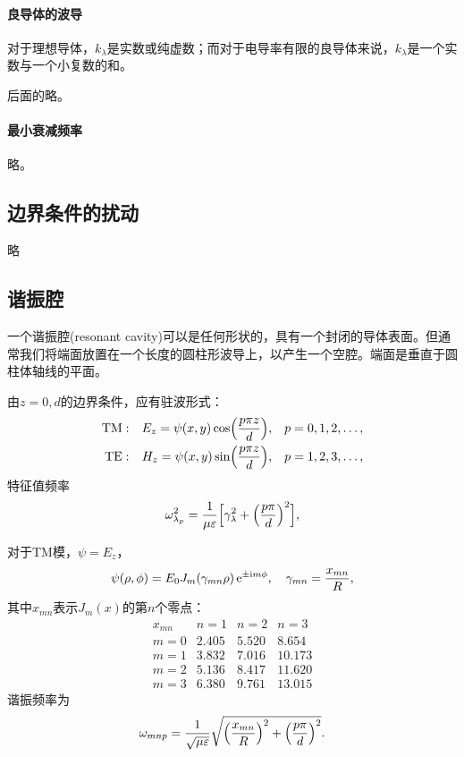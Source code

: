 \paragraph{良导体的波导}
对于理想导体，$k_\lambda$是实数或纯虚数；而对于电导率有限的良导体来说，$k_\lambda$是一个实数与一个小复数的和。

后面的略。
\paragraph{最小衰减频率}
略。
\subsection{边界条件的扰动}
略
\subsection{谐振腔}
一个谐振腔(resonant cavity)可以是任何形状的，具有一个封闭的导体表面。但通常我们将端面放置在一个长度的圆柱形波导上，以产生一个空腔。端面是垂直于圆柱体轴线的平面。

由$z=0,d$的边界条件，应有驻波形式：
\begin{align*}
    \text{TM}&:&E_z=\psi(x,y)\cos\Bigl(\frac{p\pi z}d\Bigr),&&p&=0,1,2,\ldots,\\
    \text{TE}&:&H_z=\psi(x,y)\sin\Bigl(\frac{p\pi z}d\Bigr),&&p&=1,2,3,\ldots,
\end{align*}
特征值频率
\[
    \omega_{\lambda_p}^2=\frac1{\mu\varepsilon}\Bigl[\gamma_\lambda^2+\Bigl(\frac{p\pi}d\Bigr)^2\Bigr],
\]

对于TM模，$\psi=E_z$，
\[
    \psi(\rho,\phi)=E_0J_m(\gamma_{mn}\rho)\mathop{}\!\mathrm{e}^{\pm\mathrm{i} m\phi},\quad\gamma_{mn}=\frac{x_{mn}}R,
\]
其中$x_{mn}$表示$J_m(x)$的第$n$个零点：
\begin{equation}
    \begin{matrix}
        x_{mn}&n=1&n=2&n=3\\
        m=0&2.405&5.520&8.654\\
        m=1&3.832&7.016&10.173\\
        m=2&5.136&8.417&11.620\\
        m=3&6.380&9.761&13.015
    \end{matrix}
\end{equation}
谐振频率为
\begin{equation}
    \omega_{mnp}=\frac1{\sqrt{\mu\varepsilon}}\sqrt{\Bigl(\frac{x_{mn}}R\Bigr)^2+\Bigl(\frac{p\pi}d\Bigr)^2}.
\end{equation}

